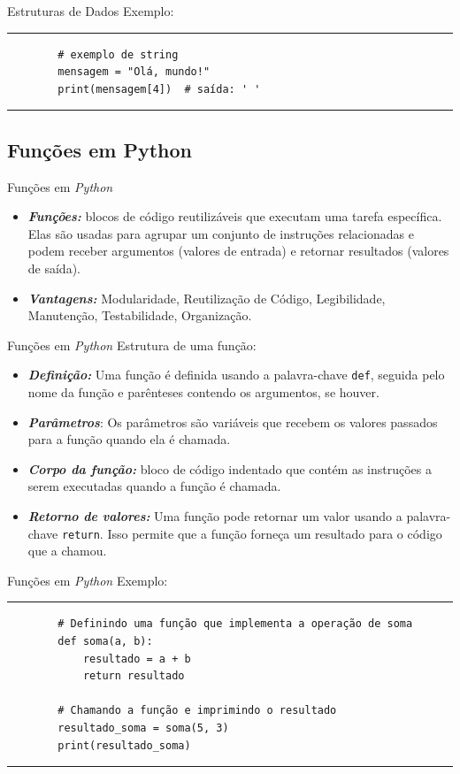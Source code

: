 \documentclass{beamer}
\begin{document}
\begin{frame}[fragile]{Estruturas de Dados}
	Exemplo:
	\rule{\textwidth}{1pt}
	\scriptsize
	\begin{verbatim}
		# exemplo de string
		mensagem = "Olá, mundo!"
		print(mensagem[4])  # saída: ' '
	\end{verbatim}
	\rule{\textwidth}{1pt}
\end{frame}

\subsection{Funções em Python}
\begin{frame}{Funções em \textit{Python}}
	\begin{itemize}
		\item \textbf{\textit{Funções:}} blocos de código reutilizáveis que executam uma tarefa específica. Elas são usadas para agrupar um conjunto de instruções relacionadas e podem receber argumentos (valores de entrada) e retornar resultados (valores de saída).
		\item \textbf{\textit{Vantagens:}} Modularidade, Reutilização de Código, Legibilidade, Manutenção, Testabilidade, Organização.
	\end{itemize}
\end{frame}

\begin{frame}{Funções em \textit{Python}}
	Estrutura de uma função:
	\begin{itemize}
		\item \textbf{\textit{Definição:}} Uma função é definida usando a palavra-chave \texttt{def}, seguida pelo nome da função e parênteses contendo os argumentos, se houver.
		\item \textbf{\textit{Parâmetros}}: Os parâmetros são variáveis que recebem os valores passados para a função quando ela é chamada. 
		\item \textbf{\textit{Corpo da função:}} bloco de código indentado que contém as instruções a serem executadas quando a função é chamada. 
		\item \textbf{\textit{Retorno de valores:}} Uma função pode retornar um valor usando a palavra-chave \texttt{return}. Isso permite que a função forneça um resultado para o código que a chamou.
	\end{itemize}
\end{frame}


\begin{frame}[fragile]{Funções em \textit{Python}}
	Exemplo:
	\rule{\textwidth}{1pt}
	\scriptsize
	\begin{verbatim}
		# Definindo uma função que implementa a operação de soma
		def soma(a, b):
			resultado = a + b
			return resultado
		
		# Chamando a função e imprimindo o resultado
		resultado_soma = soma(5, 3)
		print(resultado_soma)
			\end{verbatim}
	\rule{\textwidth}{1pt}
\end{frame}
\end{document}
